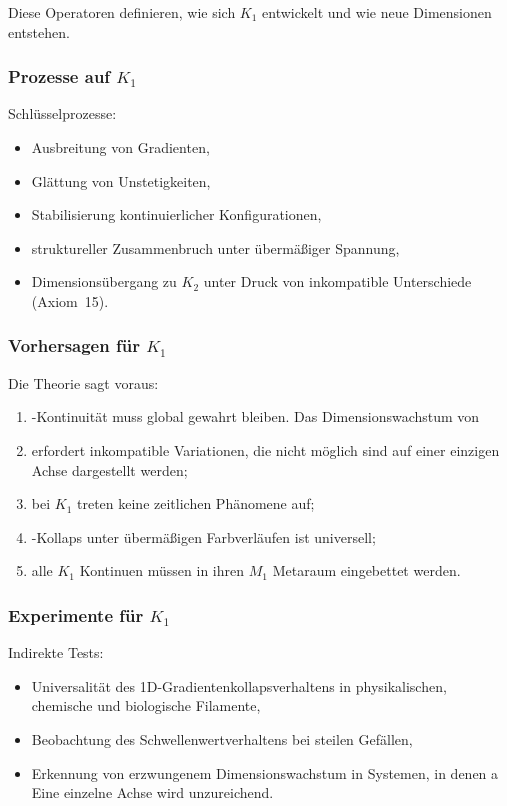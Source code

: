 Diese Operatoren definieren, wie sich $K_1$ entwickelt und wie neue Dimensionen entstehen.

\subsubsection{Prozesse auf \texorpdfstring{$K_1$}{K_1}}

Schlüsselprozesse:
\begin{itemize}
    \item Ausbreitung von Gradienten,
    \item Glättung von Unstetigkeiten,
    \item Stabilisierung kontinuierlicher Konfigurationen,
    \item struktureller Zusammenbruch unter übermäßiger Spannung,
    \item Dimensionsübergang zu $K_2$ unter Druck von
          inkompatible Unterschiede (Axiom~15).
\end{itemize}

\subsubsection{Vorhersagen für \texorpdfstring{$K_1$}{K_1}}

Die Theorie sagt voraus:
\begin{enumerate}
    Die \item-Kontinuität muss global gewahrt bleiben.
    Das Dimensionswachstum von \item erfordert inkompatible Variationen, die nicht möglich sind
          auf einer einzigen Achse dargestellt werden;
    \item bei $K_1$ treten keine zeitlichen Phänomene auf;
    \item-Kollaps unter übermäßigen Farbverläufen ist universell;
    \item alle $K_1$ Kontinuen müssen in ihren $M_1$ Metaraum eingebettet werden.
\end{enumerate}

\subsubsection{Experimente für \texorpdfstring{$K_1$}{K_1}}

Indirekte Tests:
\begin{itemize}
    \item Universalität des 1D-Gradientenkollapsverhaltens in physikalischen,
          chemische und biologische Filamente,
    \item Beobachtung des Schwellenwertverhaltens bei steilen Gefällen,
    \item Erkennung von erzwungenem Dimensionswachstum in Systemen, in denen a
          Eine einzelne Achse wird unzureichend.
\end{itemize}

